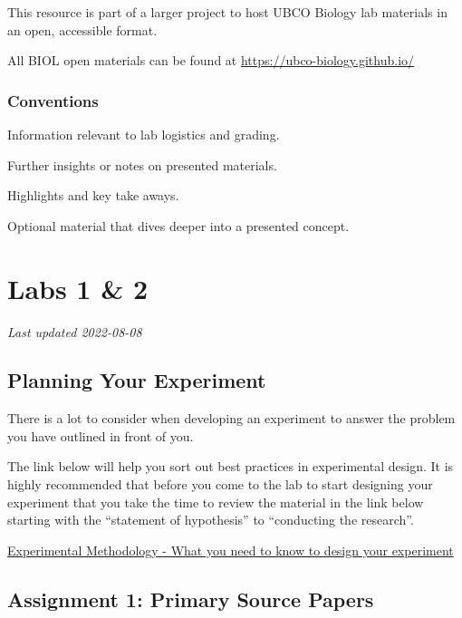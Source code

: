 \documentclass[
]{book}
\begin{document}
This resource is part of a larger project to host UBCO Biology lab materials in an open, accessible format.

All BIOL open materials can be found at \url{https://ubco-biology.github.io/}

\hypertarget{conventions}{%
\section*{Conventions}\label{conventions}}

Information relevant to lab logistics and grading.

Further insights or notes on presented materials.

Highlights and key take aways.

Optional material that dives deeper into a presented concept.

\hypertarget{part-labs-1-2}{%
\part*{Labs 1 \& 2}\label{part-labs-1-2}}

\emph{Last updated 2022-08-08}

\hypertarget{planning-your-experiment}{%
\chapter*{Planning Your Experiment}\label{planning-your-experiment}}

There is a lot to consider when developing an experiment to answer the problem you have outlined in front of you.

The link below will help you sort out best practices in experimental design. It is highly recommended that before you come to the lab to start designing your experiment that you take the time to review the material in the link below starting with the ``statement of hypothesis'' to ``conducting the research''.

\href{https://ubco-biology.github.io/BIOL-116-Lab-Manual/statement-of-hypothesis.html}{Experimental Methodology - What you need to know to design your experiment}

\hypertarget{assignment-1-primary-source-papers}{%
\chapter*{Assignment 1: Primary Source Papers}\label{assignment-1-primary-source-papers}}
\end{document}
